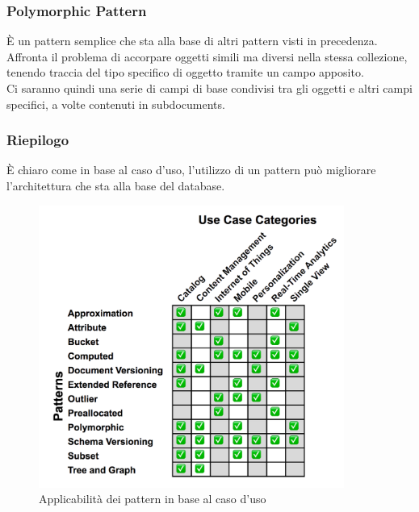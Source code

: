 \subsubsection{Polymorphic Pattern}
È un pattern semplice che sta alla base di altri pattern visti in precedenza. Affronta il problema di accorpare oggetti simili ma diversi nella stessa collezione, tenendo traccia del tipo specifico di oggetto tramite un campo apposito.\\
Ci saranno quindi una serie di campi di base condivisi tra gli oggetti e altri campi specifici, a volte contenuti in subdocuments.\\

\subsubsection{Riepilogo}
È chiaro come in base al caso d'uso, l'utilizzo di un pattern può migliorare l'architettura che sta alla base del database.

\begin{figure}[htbp]
\begin{center}
\includegraphics[height=25em]{immagini/patterns-table.png}
\caption{Applicabilità dei pattern in base al caso d'uso}
\end{center}
\end{figure}

